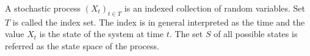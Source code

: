  A stochastic process $(X_t)_{t \in T}$ is an indexed collection of random variables. Set $T$ is called the index set. The index is in general interpreted as the time and the value $X_t$ is the state of the system at time $t$. The set $S$ of all possible states is referred as the state space of the process.
